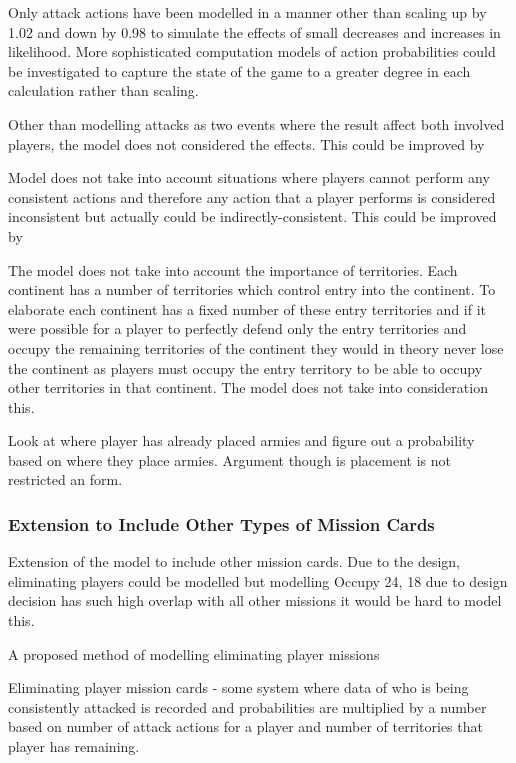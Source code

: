 \documentclass[parskip]{cs4rep}
\begin{document}
Only attack actions have been modelled in a manner other than scaling up by 1.02 and down by 0.98 to simulate the effects of small decreases and increases in likelihood. More sophisticated computation models of action probabilities could be investigated to capture the state of the game to a greater degree in each calculation rather than scaling.

Other than modelling attacks as two events where the result affect both involved players, the model does not considered the effects. This could be improved by

Model does not take into account situations where players cannot perform any consistent actions and therefore any action that a player performs is considered inconsistent but actually could be indirectly-consistent. This could be improved by

The model does not take into account the importance of territories. Each continent has a number of territories which control entry into the continent. To elaborate each continent has a fixed number of these entry territories and if it were possible for a player to perfectly defend only the entry territories and occupy the remaining territories of the continent they would in theory never lose the continent as players must occupy the entry territory to be able to occupy other territories in that continent. The model does not take into consideration this.

Look at where player has already placed armies and figure out a probability based on where they place armies. Argument though is placement is not restricted an form.

\subsubsection{Extension to Include Other Types of Mission Cards}

Extension of the model to include other mission cards. Due to the design, eliminating players could be modelled but modelling Occupy 24, 18 due to design decision has such high overlap with all other missions it would be hard to model this.

A proposed method of modelling eliminating player missions

Eliminating player mission cards - some system where data of who is being consistently attacked is recorded and probabilities are multiplied by a number based on number of attack actions for a player and number of territories that player has remaining.
\end{document}
